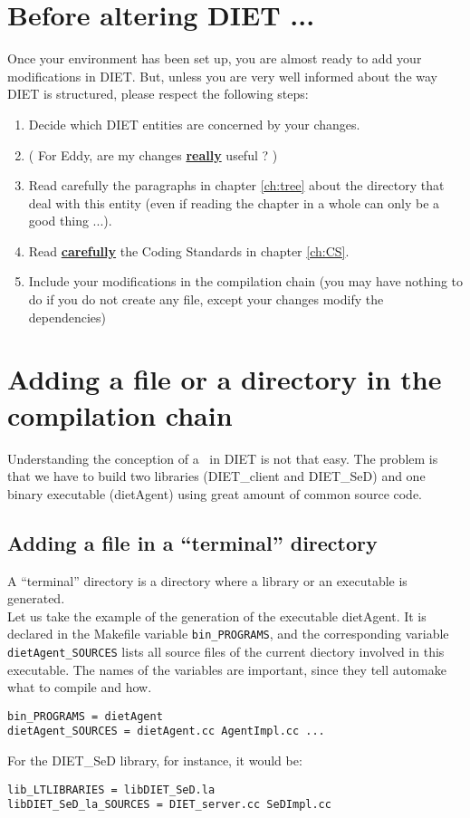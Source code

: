 \section{Before altering DIET ...}

Once your environment has been set up, you are almost ready to add
your modifications in DIET. But, unless you are very well informed
about the way DIET is structured, please respect the following steps:
\begin{enumerate}
\item Decide which DIET entities are concerned by your changes.
\item ( For Eddy, are my changes \underline{\textbf{really}} useful ? )
\item Read carefully the paragraphs in chapter \ref{ch:tree} about the
  directory that deal with this entity (even if reading the chapter in
  a whole can only be a good thing ...).
\item Read \underline{\textbf{carefully}} the Coding Standards in
  chapter \ref{ch:CS}.
\item Include your modifications in the compilation chain (you may
  have nothing to do if you do not create any file, except your
  changes modify the dependencies)
\end{enumerate}


\section{Adding a file or a directory in the compilation chain}


Understanding the conception of a \makeam\ in DIET is not that
easy. The problem is that we have to build two libraries
(\textsf{DIET\_client} and \textsf{DIET\_SeD}) and one binary
executable (\textsf{dietAgent}) using great amount of common source
code.

\subsection{Adding a file in a ``terminal'' directory}

A ``terminal'' directory is a directory where a library or an
executable is generated.\\

Let us take the example of the generation of the executable
\textsf{dietAgent}.  It is declared in the Makefile variable
\texttt{bin\_PROGRAMS}, and the corresponding variable
\texttt{dietAgent\_SOURCES} lists all source files of the current
diectory involved in this executable. The names of the variables are
important, since they tell \textsf{automake} what to compile and how.
\begin{verbatim}
bin_PROGRAMS = dietAgent
dietAgent_SOURCES = dietAgent.cc AgentImpl.cc ...
\end{verbatim}
For the \textsf{DIET\_SeD} library, for instance, it would be:
\begin{verbatim}
lib_LTLIBRARIES = libDIET_SeD.la
libDIET_SeD_la_SOURCES = DIET_server.cc SeDImpl.cc
\end{verbatim}

